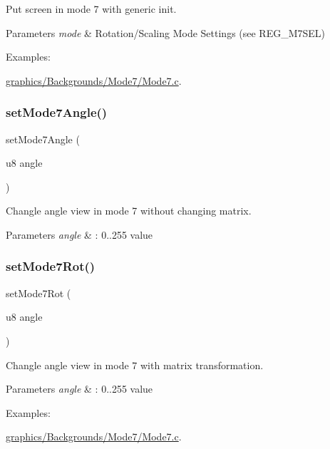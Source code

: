 Put screen in mode 7 with generic init. 


\begin{DoxyParams}{Parameters}
{\em mode} & Rotation/\+Scaling Mode Settings (see R\+E\+G\+\_\+\+M7\+S\+EL) \\
\hline
\end{DoxyParams}
\begin{Desc}
\item[Examples\+: ]\par
\hyperlink{a00402}{graphics/\+Backgrounds/\+Mode7/\+Mode7.\+c}.\end{Desc}
\mbox{\label{a00353_ac4b1645f376fa266f0e614a1d7903a31}} 
\subsubsection{\texorpdfstring{set\+Mode7\+Angle()}{setMode7Angle()}}
{\footnotesize\ttfamily set\+Mode7\+Angle (\begin{DoxyParamCaption}\item[{u8}]{angle }\end{DoxyParamCaption})}



Changle angle view in mode 7 without changing matrix. 


\begin{DoxyParams}{Parameters}
{\em angle} & \+: 0..255 value \\
\hline
\end{DoxyParams}
\mbox{\label{a00353_a4d332cdc88b26fc9ec2cdd4f6710ce8c}} 
\subsubsection{\texorpdfstring{set\+Mode7\+Rot()}{setMode7Rot()}}
{\footnotesize\ttfamily set\+Mode7\+Rot (\begin{DoxyParamCaption}\item[{u8}]{angle }\end{DoxyParamCaption})}



Changle angle view in mode 7 with matrix transformation. 


\begin{DoxyParams}{Parameters}
{\em angle} & \+: 0..255 value \\
\hline
\end{DoxyParams}
\begin{Desc}
\item[Examples\+: ]\par
\hyperlink{a00402}{graphics/\+Backgrounds/\+Mode7/\+Mode7.\+c}.\end{Desc}
\mbox{\label{a00353_aa14785c4eb1ce08cc02eb98d26c98c44}} 
